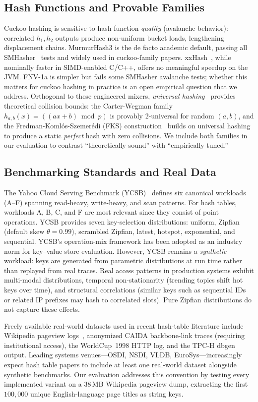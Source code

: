 \documentclass[10pt,journal,compsoc]{IEEEtran}
\begin{document}
\subsection{Hash Functions and Provable Families}
Cuckoo hashing is sensitive to hash function \emph{quality} (avalanche behavior): correlated $h_1, h_2$ outputs produce non-uniform bucket loads, lengthening displacement chains. MurmurHash3 is the de facto academic default, passing all SMHasher~\cite{smhasher} tests and widely used in cuckoo-family papers. xxHash~\cite{smhasher}, while nominally faster in SIMD-enabled C/C++, offers no meaningful speedup on the JVM. FNV-1a is simpler but fails some SMHasher avalanche tests; whether this matters for cuckoo hashing in practice is an open empirical question that we address. Orthogonal to these engineered mixers, \emph{universal hashing}~\cite{carter1979universal} provides theoretical collision bounds: the Carter-Wegman family $h_{a,b}(x) = ((ax + b) \bmod p)$ is provably 2-universal for random $(a, b)$, and the Fredman-Kom\-l\'os-Szemer\'edi (FKS) construction~\cite{fks1984perfect} builds on universal hashing to produce a static \emph{perfect} hash with zero collisions. We include both families in our evaluation to contrast ``theoretically sound'' with ``empirically tuned.''

\subsection{Benchmarking Standards and Real Data}
The Yahoo Cloud Serving Benchmark (YCSB)~\cite{cooper2010ycsb} defines six canonical workloads (A--F) spanning read-heavy, write-heavy, and scan patterns. For hash tables, workloads A, B, C, and F are most relevant since they consist of point operations. YCSB provides seven key-selection distributions: uniform, Zipfian (default skew $\theta=0.99$), scrambled Zipfian, latest, hotspot, exponential, and sequential. YCSB's operation-mix framework has been adopted as an industry norm for key--value store evaluation. However, YCSB remains a \emph{synthetic} workload: keys are generated from parametric distributions at run time rather than replayed from real traces. Real access patterns in production systems exhibit multi-modal distributions, temporal non-stationarity (trending topics shift hot keys over time), and structural correlations (similar keys such as sequential IDs or related IP prefixes may hash to correlated slots). Pure Zipfian distributions do not capture these effects.

Freely available real-world datasets used in recent hash-table literature include Wikipedia pageview logs~\cite{wikipedia_pageviews}, anonymized CAIDA backbone-link traces (requiring institutional access), the WorldCup~1998 HTTP log, and the TPC-H dbgen output. Leading systems venues---OSDI, NSDI, VLDB, EuroSys---increasingly expect hash table papers to include at least one real-world dataset alongside synthetic benchmarks. Our evaluation addresses this convention by testing every implemented variant on a $38$\,MB Wikipedia pageview dump, extracting the first $100{,}000$ unique English-language page titles as string keys.
\end{document}
